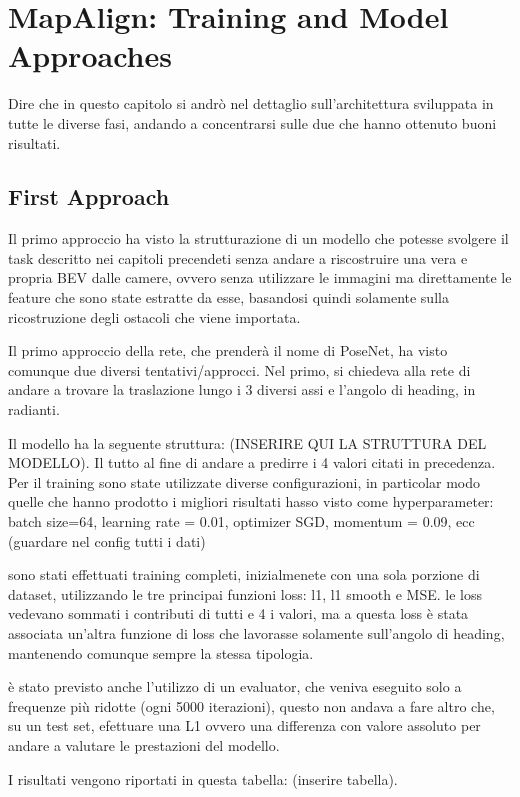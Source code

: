 \NoBgThispage
\chapter{MapAlign: Training and Model Approaches}

Dire che in questo capitolo si andrò nel dettaglio sull'architettura sviluppata in tutte le diverse fasi, andando a concentrarsi sulle due che hanno ottenuto buoni risultati. 

\section{First Approach}
Il primo approccio ha visto la strutturazione di un modello che potesse svolgere il task descritto nei capitoli precendeti senza andare a riscostruire una vera e propria BEV dalle camere, ovvero senza utilizzare le immagini ma direttamente le feature che sono state estratte da esse, basandosi quindi solamente sulla ricostruzione degli ostacoli che viene importata. 

Il primo approccio della rete, che prenderà il nome di PoseNet, ha visto comunque due diversi tentativi/approcci. 
Nel primo, si chiedeva alla rete di andare a trovare la traslazione lungo i 3 diversi assi e l'angolo di heading, in radianti.

Il modello ha la seguente struttura:
(INSERIRE QUI LA STRUTTURA DEL MODELLO). 
Il tutto al fine di andare a predirre i 4 valori citati in precedenza. 
Per il training sono state utilizzate diverse configurazioni, in particolar modo quelle che hanno prodotto i migliori risultati hasso visto come hyperparameter:
batch size=64, learning rate = 0.01, optimizer SGD, momentum = 0.09, ecc (guardare nel config tutti i dati)

sono stati effettuati training completi, inizialmenete con una sola porzione di dataset, utilizzando le tre principai funzioni loss: l1, l1 smooth e MSE. 
le loss vedevano sommati i contributi di tutti e 4 i valori, ma a questa loss è stata associata un'altra funzione di loss che lavorasse solamente sull'angolo di heading, mantenendo comunque sempre la stessa tipologia. 

è stato previsto anche l'utilizzo di un evaluator, che veniva eseguito solo a frequenze più ridotte (ogni 5000 iterazioni), questo non andava a fare altro che, su un test set, efettuare una L1 ovvero una differenza con valore assoluto per andare a valutare le prestazioni del modello. 

I risultati vengono riportati in questa tabella:
(inserire tabella). 

